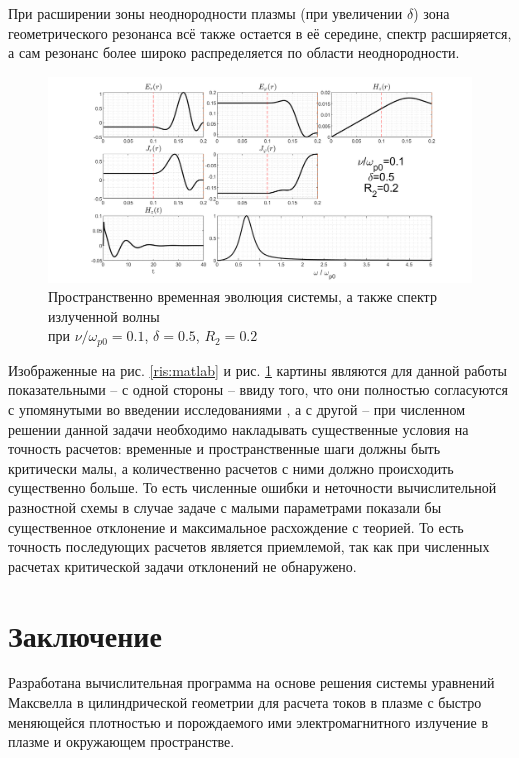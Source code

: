 \documentclass[a4paper]{article}
\begin{document}
При расширении зоны неоднородности плазмы (при увеличении $\delta$) зона геометрического резонанса всё также остается в её середине, спектр расширяется, а сам резонанс более широко распределяется по области неоднородности.
\begin{figure}[H]\centering	
	\includegraphics[width=0.9\linewidth]{pics/pic9}
	\caption{Пространственно временная эволюция системы, а также спектр излученной волны \\ при $\nu/\omega_{p0}=0.1$, $\delta=0.5$, $R_{2}=0.2$}
	\label{ris:matlab_2}
\end{figure}

Изображенные на рис. \ref{ris:matlab} и рис. \ref{ris:matlab_2} картины являются для данной работы показательными -- с одной стороны -- ввиду того, что они полностью согласуются с упомянутыми во введении исследованиями \cite{Gildenburg2007,Vved2005}, а с другой -- при численном решении данной задачи необходимо накладывать существенные условия на точность расчетов: временные и пространственные шаги должны быть критически малы, а количественно расчетов с ними должно происходить существенно больше. То есть численные ошибки и неточности вычислительной разностной схемы в случае задаче с малыми параметрами показали бы существенное отклонение и максимальное расхождение с теорией. То есть точность последующих расчетов является приемлемой, так как при численных расчетах критической задачи отклонений не обнаружено.



%

\section*{Заключение}

Разработана вычислительная программа на основе решения системы уравнений Максвелла в цилиндрической геометрии для расчета токов в плазме с быстро меняющейся плотностью и порождаемого ими электромагнитного излучение в плазме и окружающем пространстве.
\end{document}
